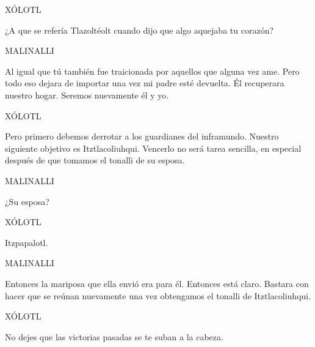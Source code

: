 \documentclass[11pt,letterpaper]{article}
\begin{document}
\begin{center}
XÓLOTL
\\
\par
¿A que se refería Tlazoltéolt cuando dijo que algo aquejaba tu corazón?
\\
\par
MALINALLI
\\
\par
Al igual que tú también fue traicionada por aquellos que alguna vez ame. Pero todo eso dejara de importar una vez mi padre esté devuelta. Él recuperara nuestro hogar. Seremos nuevamente él y yo.
\\
\par
XÓLOTL
\\
\par
Pero primero debemos derrotar a los guardianes del inframundo. Nuestro siguiente objetivo es Itztlacoliuhqui. Vencerlo no será tarea sencilla, en especial después de que tomamos el tonalli de su esposa.
\\
\par
MALINALLI
\\
\par
¿Su esposa?
\\
\par
XÓLOTL
\\
\par
Itzpapalotl.
\\
\par
MALINALLI
\\
\par
Entonces la mariposa que ella envió era para él. Entonces está claro. Bastara con hacer que se reúnan nuevamente una vez obtengamos el tonalli de Itztlacoliuhqui.
\\
\par
XÓLOTL
\\
\par
No dejes que las victorias pasadas se te suban a la cabeza.
\end{center}
\end{document}
